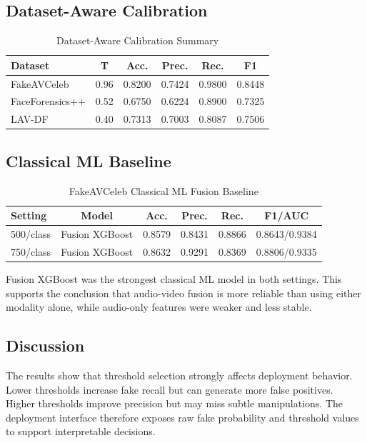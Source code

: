 \documentclass[conference]{IEEEtran}
\begin{document}
\subsection{Dataset-Aware Calibration}
\begin{table}[htbp]
\caption{Dataset-Aware Calibration Summary}
\centering
\begin{tabular}{lccccc}
\toprule
Dataset & T & Acc. & Prec. & Rec. & F1 \\
\midrule
FakeAVCeleb & 0.96 & 0.8200 & 0.7424 & 0.9800 & 0.8448 \\
FaceForensics++ & 0.52 & 0.6750 & 0.6224 & 0.8900 & 0.7325 \\
LAV-DF & 0.40 & 0.7313 & 0.7003 & 0.8087 & 0.7506 \\
\bottomrule
\end{tabular}
\end{table}

\subsection{Classical ML Baseline}
\begin{table}[htbp]
\caption{FakeAVCeleb Classical ML Fusion Baseline}
\centering
\begin{tabular}{lccccc}
\toprule
Setting & Model & Acc. & Prec. & Rec. & F1/AUC \\
\midrule
500/class & Fusion XGBoost & 0.8579 & 0.8431 & 0.8866 & 0.8643/0.9384 \\
750/class & Fusion XGBoost & 0.8632 & 0.9291 & 0.8369 & 0.8806/0.9335 \\
\bottomrule
\end{tabular}
\end{table}

Fusion XGBoost was the strongest classical ML model in both settings. This supports the conclusion that audio-video fusion is more reliable than using either modality alone, while audio-only features were weaker and less stable.

\subsection{Discussion}
The results show that threshold selection strongly affects deployment behavior. Lower thresholds increase fake recall but can generate more false positives. Higher thresholds improve precision but may miss subtle manipulations. The deployment interface therefore exposes raw fake probability and threshold values to support interpretable decisions.
\end{document}
